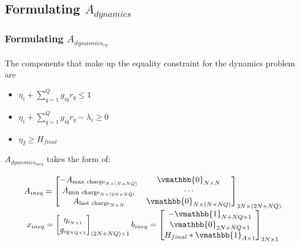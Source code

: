\documentclass[letterpaper, 10pt, conference]{IEEEtran}
\begin{document}
\subsection{Formulating $A_{dynamics}$}

\subsubsection{Formulating $A_{dynamics_{eq}}$}
The components that make up the equality constraint for the dynamics
problem are

\begin{itemize}
\item
  \(\eta_i + \sum_{q=1}^Q g_{iq} r_q \leq 1\)
\item
  \(\eta_i + \sum_{q=1}^Q g_{iq} r_q - \lambda_i \geq 0\)
\item
  \(\eta_{I} \geq H_{final}\)
\end{itemize}

\(A_{dyanmics_{ineq}}\) takes the form of:

\begin{equation}
\begin{array}{c}
    A_{ineq} =
    \begin{bmatrix}
        -A_{\textrm{max charge}_{N \times (N+NQ)}} & \vmathbb{0}_{N \times N}        \\
        A_{\textrm{min charge}_{N \times (2N+NQ)}} & \cdots                         \\
        A_{\textrm{last charge}_{N \times N}}      & \vmathbb{0}_{N \times (N + NQ)} \\
    \end{bmatrix}_{3N \times (2N + NQ)} \\
    x_{ineq} =
    \begin{bmatrix}
        \eta_{i_{N \times 1}} \\
        g_{iq_{NQ \times 1}} \\
    \end{bmatrix}_{(2N + NQ) \times 1}
    b_{ineq} =
    \begin{bmatrix}
        -\vmathbb{1}_{N + NQ \times 1} \\
        \vmathbb{0}_{2N + NQ \times 1} \\
        H_{final}*\vmathbb{1}_{A \times 1} \\
    \end{bmatrix}_{3N \times 1}
\end{array}
\end{equation}
\end{document}
